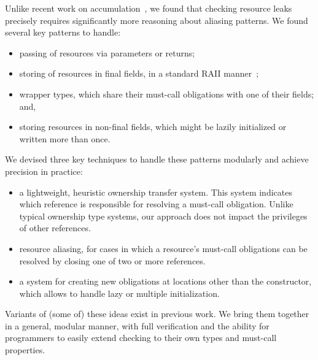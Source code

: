 Unlike recent work on accumulation~\cite{KelloggRSSE2020}, we found
that checking resource leaks precisely requires significantly more
reasoning about aliasing patterns.  We found several key patterns to
handle:
\begin{itemize}
\item passing of resources via parameters or returns;
\item storing of resources in final fields, in a standard RAII manner~\cite{raii};
\item wrapper types, which share their must-call obligations with one of their fields; and,
\item storing resources in non-final fields, which might be lazily initialized or
  written more than once.
\end{itemize}
We devised three key techniques to handle these patterns modularly
and achieve precision in practice:
\begin{itemize}
\item a lightweight, heuristic ownership transfer system. This system
  indicates which reference is responsible for resolving a must-call
  obligation. Unlike typical ownership type systems, our approach does
  not impact the privileges of other references.
\item resource aliasing, for cases in which a resource's must-call obligations
  can be resolved by closing one of two or more references.
\item a system for creating new obligations at locations other than the
  constructor, which allows \Tool to handle lazy or multiple initialization.
\end{itemize}
Variants of (some of) these ideas exist in previous work.  We bring
them together in a general, modular manner, with full verification and
the ability for programmers to easily extend checking to their own
types and must-call properties.


